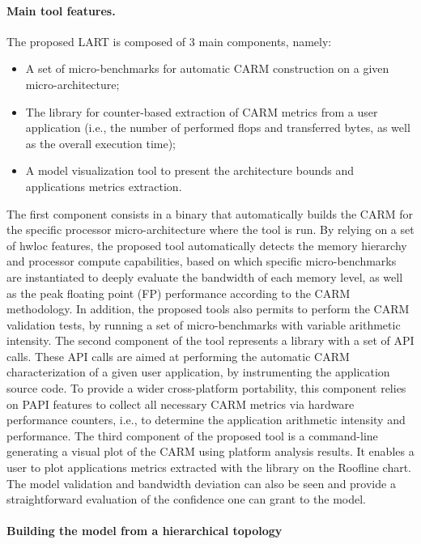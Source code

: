 \documentclass[twoside,twocolumn,8pt]{extarticle}
\begin{document}
\paragraph*{Main tool features.}

The proposed LART is composed of 3 main components, namely:
\begin{itemize}
\item A set of micro-benchmarks for automatic CARM construction on a given micro-architecture;
\item The library for counter-based extraction  of CARM metrics from a user application (i.e., the number of performed flops and
  transferred bytes, as well as the overall execution time);
\item A model visualization tool to present the architecture bounds and applications metrics extraction.
\end{itemize}

The first component consists in a binary that automatically  builds the CARM for the specific processor micro-architecture where
the tool is run. By relying on a set of hwloc features, the proposed tool automatically detects the memory hierarchy and processor
compute capabilities, based on which specific micro-benchmarks are instantiated to deeply evaluate the bandwidth of each memory
level,  as well as the peak floating point (FP) performance according to the CARM methodology.
In addition, the proposed tools also permits to perform the CARM validation tests, by running a set of micro-benchmarks with
variable arithmetic intensity. 
The second component of the tool represents  a library with a set of API calls. These API calls are aimed at performing the
automatic CARM characterization of a given user application, by instrumenting the application source code.
To provide a wider cross-platform portability, this component relies on PAPI features to collect all necessary CARM metrics via
hardware performance counters, i.e., to determine the application arithmetic intensity and performance.
The third component of the proposed tool is a command-line generating a visual plot of the CARM using platform analysis results. It
enables a user to plot applications metrics extracted with the library on the Roofline chart. The model validation and bandwidth
deviation can also be seen and provide a straightforward evaluation of the confidence one can grant to the model.

\paragraph*{Building the model from a hierarchical topology}
\end{document}
